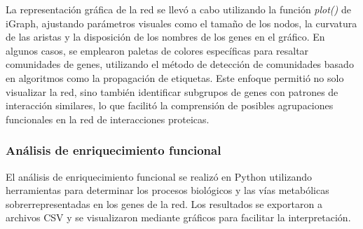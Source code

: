 La representación gráfica de la red se llevó a cabo utilizando la función \textit{plot()} de iGraph, ajustando parámetros visuales como el tamaño de los nodos, la curvatura de las aristas y la disposición de los nombres de los genes en el gráfico. En algunos casos, se emplearon paletas de colores específicas para resaltar comunidades de genes, utilizando el método de detección de comunidades basado en algoritmos como la propagación de etiquetas. Este enfoque permitió no solo visualizar la red, sino también identificar subgrupos de genes con patrones de interacción similares, lo que facilitó la comprensión de posibles agrupaciones funcionales en la red de interacciones proteicas.

\subsubsection{\textbf{Análisis de enriquecimiento funcional}}

El análisis de enriquecimiento funcional se realizó en Python utilizando herramientas para determinar los procesos biológicos y las vías metabólicas sobrerrepresentadas en los genes de la red. Los resultados se exportaron a archivos CSV y se visualizaron mediante gráficos para facilitar la interpretación.







